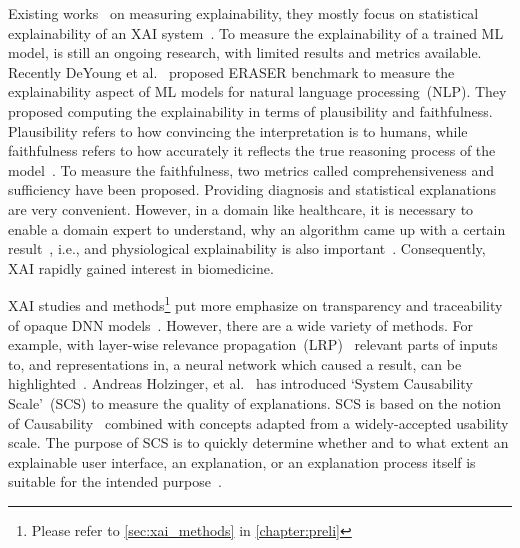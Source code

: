 \hspace*{3.5mm} Existing works~\cite{holzinger2020measuring,holzinger2019causability,karim2019onconetexplainer,ying2019gnnexplainer} on measuring explainability, they mostly focus on statistical explainability of an XAI system~\cite{li2017comprehensive}. To measure the explainability of a trained ML model, is still an ongoing research, with limited results and metrics available. Recently DeYoung et al.~\cite{deyoung2019eraser} proposed ERASER benchmark to measure the explainability aspect of ML models for natural language processing~(NLP). They proposed computing the explainability in terms of plausibility and faithfulness. Plausibility refers to how convincing the interpretation is to humans, while faithfulness refers to how accurately it reflects the true reasoning process of the model~\cite{jacovi2020towards}. To measure the faithfulness, two metrics called comprehensiveness and sufficiency have been proposed. 
Providing diagnosis and statistical explanations are very convenient. However, in a domain like healthcare, it is necessary to enable a domain expert to understand, why an algorithm came up with a certain result~\cite{holzinger2020measuring,holzinger2019causability}, i.e., and physiological explainability is also important~\cite{holzinger2019causability}. Consequently, XAI rapidly gained interest in biomedicine. 

\hspace*{3.5mm} XAI studies and methods\footnote{Please refer to \cref{sec:xai_methods} in \cref{chapter:preli}} put more emphasize on transparency and traceability of opaque DNN models~\cite{karim2019onconetexplainer}. However, there are a wide variety of methods. For example, with layer-wise relevance propagation~(LRP)~\cite{LRP1,LRP2,LRP3} relevant parts of inputs to, and representations in, a neural network which caused a result, can be highlighted~\cite{holzinger2020measuring}. 
Andreas Holzinger, et al.~\cite{holzinger2020measuring} has introduced `System Causability Scale'~(SCS) to measure the quality of explanations. SCS is based on the notion of Causability~\cite{holzinger2019causability} combined with concepts adapted from a widely-accepted usability scale. The purpose of SCS is to quickly determine whether and to what extent an explainable user interface, an explanation, or an explanation process itself is suitable for the intended purpose~\cite{holzinger2020measuring}.  


